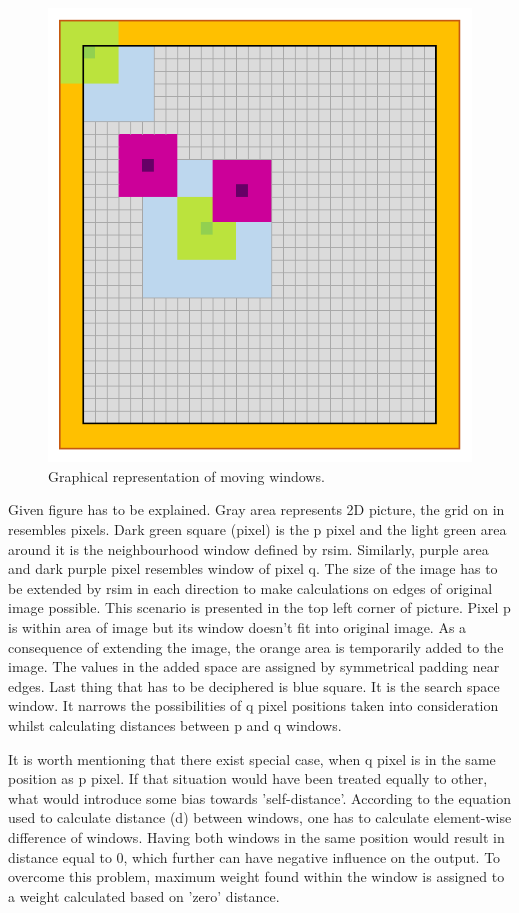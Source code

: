 \begin{figure}[H]
	\centering{}
	\includegraphics[scale=0.7]{figures/module05/m5windows}
	\caption{Graphical representation of moving windows.} 
\end{figure}

Given figure has to be explained. Gray area represents 2D picture, the grid on in resembles pixels. Dark green square (pixel) is the p pixel and the light green area around it is the neighbourhood window defined by rsim. Similarly, purple area and dark purple pixel resembles window of pixel q. The size of the image has to be extended by rsim in each direction to make calculations on edges of original image possible. This scenario is presented in the top left corner of picture. Pixel p is within area of image but its window doesn't fit into original image. As a consequence of extending the image, the orange area is temporarily added to the image. The values in the added space are assigned by symmetrical padding near edges. Last thing that has to be deciphered is blue square. It is the search space window. It narrows the possibilities of q pixel positions taken into consideration whilst calculating distances between p and q windows.

It is worth mentioning that there exist special case, when q pixel is in the same position as p pixel. If that situation would have been treated equally to other, what would introduce some bias towards 'self-distance'. According to the equation used to calculate distance (d) between windows, one has to calculate element-wise difference of windows. Having both windows in the same position would result in distance equal to 0, which further can have negative influence on the output. To overcome this problem, maximum weight found within the window is assigned to a weight calculated based on 'zero' distance.



